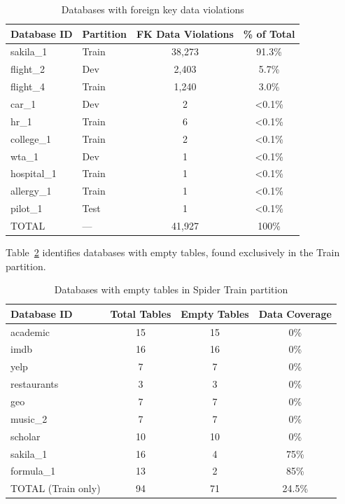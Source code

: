 \documentclass[]{einformatica}
\begin{document}
\begin{table}[ht]
    \caption{Databases with foreign key data violations}
    \label{tab:schema_fk_data_violations}
    \centering
    \footnotesize
    \begin{tabular}{llcc}
        \toprule
        \textbf{Database ID} & \textbf{Partition} & \textbf{FK Data Violations} & \textbf{\% of Total} \\
        \midrule
        sakila\_1 & Train & 38,273 & 91.3\% \\
        flight\_2 & Dev & 2,403 & 5.7\% \\
        flight\_4 & Train & 1,240 & 3.0\% \\
        car\_1 & Dev & 2 & <0.1\% \\
        hr\_1 & Train & 6 & <0.1\% \\
        college\_1 & Train & 2 & <0.1\% \\
        wta\_1 & Dev & 1 & <0.1\% \\
        hospital\_1 & Train & 1 & <0.1\% \\
        allergy\_1 & Train & 1 & <0.1\% \\
        pilot\_1 & Test & 1 & <0.1\% \\
        \midrule
        TOTAL & --- & 41,927 & 100\% \\
        \bottomrule
    \end{tabular}
\end{table}

Table~\ref{tab:schema_empty_tables} identifies databases with empty tables, found exclusively in the Train partition.

\begin{table}[ht]
    \caption{Databases with empty tables in Spider Train partition}
    \label{tab:schema_empty_tables}
    \centering
    \footnotesize
    \begin{tabular}{lccc}
        \toprule
        \textbf{Database ID} & \textbf{Total Tables} & \textbf{Empty Tables} & \textbf{Data Coverage} \\
        \midrule
        academic & 15 & 15 & 0\% \\
        imdb & 16 & 16 & 0\% \\
        yelp & 7 & 7 & 0\% \\
        restaurants & 3 & 3 & 0\% \\
        geo & 7 & 7 & 0\% \\
        music\_2 & 7 & 7 & 0\% \\
        scholar & 10 & 10 & 0\% \\
        sakila\_1 & 16 & 4 & 75\% \\
        formula\_1 & 13 & 2 & 85\% \\
        \midrule
        TOTAL (Train only) & 94 & 71 & 24.5\% \\
        \bottomrule
    \end{tabular}
\end{table}
\end{document}
